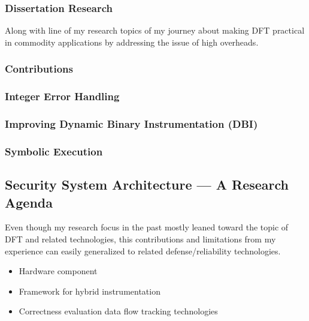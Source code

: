\documentclass[letterpaper, 10pt]{article}
\begin{document}
\begin{small}
\subsubsection*{Dissertation Research}
Along with line of my research topics of my journey about making DFT practical
in commodity applications by addressing the issue of high overheads.


\subsubsection*{Contributions}

\subsubsection*{Integer Error Handling}

\subsubsection*{Improving Dynamic Binary Instrumentation (DBI)}

\subsubsection*{Symbolic Execution}


\subsection*{Security System Architecture --- A Research Agenda}
Even though my research focus in the past mostly leaned toward the topic of DFT
and related technologies, this contributions and limitations from my experience
can easily generalized to related defense/reliability technologies.

\begin{itemize}
 \item Hardware component
 \item Framework for hybrid instrumentation
 \item Correctness evaluation data flow tracking technologies
\end{itemize}
\end{small}

\newpage



\end{document}
